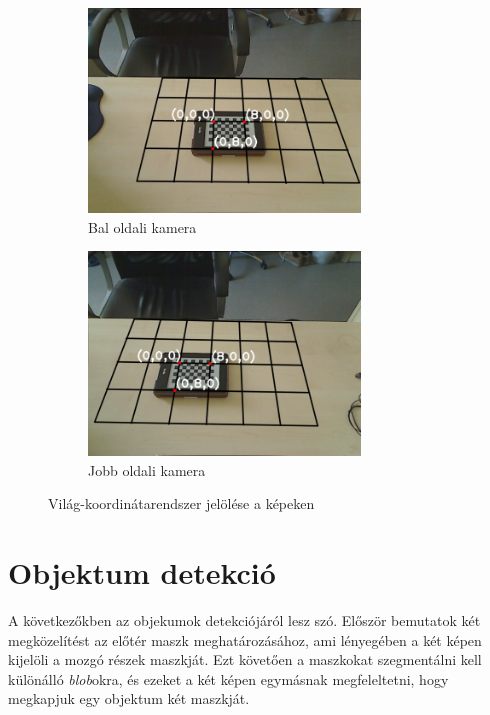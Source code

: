 \begin{figure}[tbh]
\centering
\begin{subfigure}[b]{.49\linewidth}
	\centering
	\includegraphics[width=205pt]{figures/pose0_180.png}
	\caption{Bal oldali kamera}
  \end{subfigure}
\begin{subfigure}[b]{.49\linewidth}
	\centering
	\includegraphics[width=205pt]{figures/pose1_180.png}
	\caption{Jobb oldali kamera}
  \end{subfigure}
\caption{Világ-koordinátarendszer jelölése a képeken \label{fig:pose}}
\end{figure}

\section{Objektum detekció}

A következőkben az objekumok detekciójáról lesz szó. Először bemutatok két megközelítést az előtér maszk meghatározásához, ami lényegében a két képen kijelöli a mozgó részek maszkját. Ezt követően a maszkokat szegmentálni kell különálló \textit{blob}okra, és ezeket a két képen egymásnak megfeleltetni, hogy megkapjuk egy objektum két maszkját.

